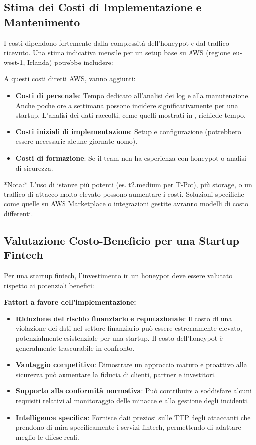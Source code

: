 \documentclass[a4paper,12pt]{report}
\begin{document}
\subsection{Stima dei Costi di Implementazione e Mantenimento}
\label{subsec:stima_costi}

I costi dipendono fortemente dalla complessità dell'honeypot e dal traffico ricevuto. Una stima indicativa mensile per un setup base su AWS (regione eu-west-1, Irlanda) potrebbe includere:


    

A questi costi diretti AWS, vanno aggiunti:

\begin{itemize}
    \item \textbf{Costi di personale}: Tempo dedicato all'analisi dei log e alla manutenzione. Anche poche ore a settimana possono incidere significativamente per una startup. L'analisi dei dati raccolti, come quelli mostrati in \cite{peiris_2024}, richiede tempo.
    \item \textbf{Costi iniziali di implementazione}: Setup e configurazione (potrebbero essere necessarie alcune giornate uomo).
    \item \textbf{Costi di formazione}: Se il team non ha esperienza con honeypot o analisi di sicurezza.
\end{itemize}

*Nota:* L'uso di istanze più potenti (es. t2.medium per T-Pot), più storage, o un traffico di attacco molto elevato possono aumentare i costi. Soluzioni specifiche come quelle su AWS Marketplace \cite{aws_marketplace} o integrazioni gestite \cite{rapid7, salient_2025} avranno modelli di costo differenti.

\subsection{Valutazione Costo-Beneficio per una Startup Fintech}
\label{subsec:costo_beneficio}

Per una startup fintech, l'investimento in un honeypot deve essere valutato rispetto ai potenziali benefici:

\textbf{Fattori a favore dell'implementazione:}
\begin{itemize}
    \item \textbf{Riduzione del rischio finanziario e reputazionale}: Il costo di una violazione dei dati nel settore finanziario può essere estremamente elevato, potenzialmente esistenziale per una startup. Il costo dell'honeypot è generalmente trascurabile in confronto.
    \item \textbf{Vantaggio competitivo}: Dimostrare un approccio maturo e proattivo alla sicurezza può aumentare la fiducia di clienti, partner e investitori.
    \item \textbf{Supporto alla conformità normativa}: Può contribuire a soddisfare alcuni requisiti relativi al monitoraggio delle minacce e alla gestione degli incidenti.
    \item \textbf{Intelligence specifica}: Fornisce dati preziosi sulle TTP degli attaccanti che prendono di mira specificamente i servizi fintech, permettendo di adattare meglio le difese reali.
\end{itemize}
\end{document}
